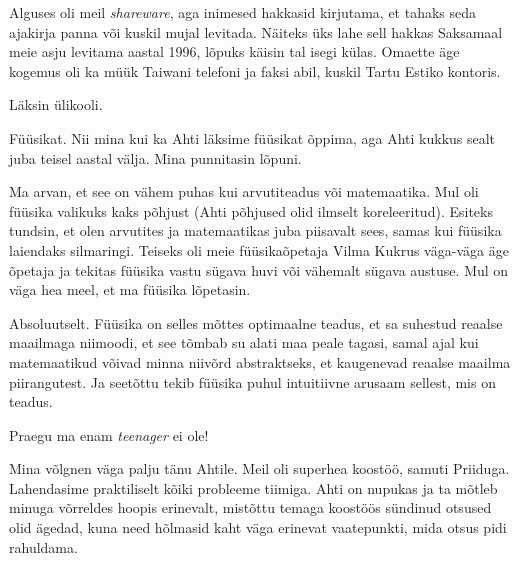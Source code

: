 Alguses oli meil \emph{shareware}, aga inimesed hakkasid kirjutama, et tahaks 
seda ajakirja panna või kuskil mujal levitada. Näiteks üks
lahe sell hakkas Saksamaal meie asju levitama aastal 
1996, lõpuks käisin tal isegi külas. Omaette äge kogemus oli ka
müük Taiwani telefoni ja faksi abil, kuskil Tartu Estiko 
kontoris. 


Läksin ülikooli.


Füüsikat. Nii mina kui ka Ahti läksime füüsikat õppima, aga Ahti kukkus sealt juba 
teisel aastal välja. Mina punnitasin lõpuni. 


Ma arvan, et see on vähem puhas kui arvutiteadus või matemaatika. Mul oli füüsika valikuks kaks 
põhjust (Ahti põhjused olid ilmselt koreleeritud). Esiteks tundsin, et olen arvutites ja matemaatikas juba piisavalt sees, samas kui 
füüsika laiendaks silmaringi. Teiseks oli meie füüsikaõpetaja Vilma Kukrus väga-väga äge õpetaja 
ja tekitas füüsika vastu sügava huvi või vähemalt sügava austuse. Mul on väga 
hea meel, et ma füüsika lõpetasin.


Absoluutselt. Füüsika on selles mõttes optimaalne teadus, et sa suhestud 
reaalse maailmaga niimoodi, et see tõmbab su alati maa peale tagasi, samal ajal kui matemaatikud võivad minna niivõrd 
abstraktseks, et kaugenevad reaalse maailma piirangutest. Ja seetõttu tekib füüsika puhul intuitiivne arusaam sellest, mis on teadus. 


Praegu ma enam \emph{teenager} ei ole!


Mina võlgnen väga palju tänu Ahtile. 
Meil oli superhea koostöö, samuti Priiduga. Lahendasime praktiliselt kõiki 
probleeme tiimiga. Ahti on nupukas ja ta mõtleb minuga võrreldes hoopis erinevalt, mistõttu 
temaga koostöös sündinud otsused olid ägedad, kuna need hõlmasid kaht 
väga erinevat vaatepunkti, mida otsus pidi rahuldama.

